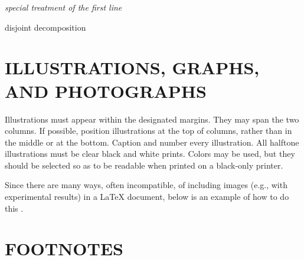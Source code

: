 \documentclass{article}
\begin{document}
\IncMargin{1em}
\begin{algorithm}
  \small
  \BlankLine
  \emph{special treatment of the first line}\;
  \caption{disjoint decomposition}\label{algo_disjdecomp}
\end{algorithm}\DecMargin{1em}

\section{ILLUSTRATIONS, GRAPHS, AND PHOTOGRAPHS}
\label{sec:illust}

Illustrations must appear within the designated margins.  They may span the two
columns.  If possible, position illustrations at the top of columns, rather
than in the middle or at the bottom.  Caption and number every illustration.
All halftone illustrations must be clear black and white prints.  Colors may be
used, but they should be selected so as to be readable when printed on a
black-only printer.

Since there are many ways, often incompatible, of including images (e.g., with
experimental results) in a LaTeX document, below is an example of how to do
this \cite{Lamp86}.

\section{FOOTNOTES}
\label{sec:foot}
\end{document}
